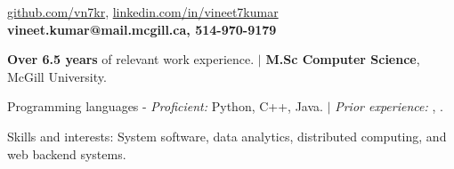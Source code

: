 \documentclass{resume} %
\begin{document}
\begin{hSubsection}
{
    \href{https://github.com/vn7kr}{github.com/vn7kr},
    \href{https://linkedin.com/in/vineet7kumar}{linkedin.com/in/vineet7kumar}
}
{
    \textbf{vineet.kumar@mail.mcgill.ca, 514-970-9179}
}
{%
}
\end{hSubsection}



\smallskip \smallskip 
\begin{rSection}{} \smallskip 
\begin{lSubsection} 
\item \textbf{Over 6.5 years} of relevant work experience.
        $\vert$ \textbf{M.Sc Computer Science}, McGill University. 
\item Programming languages - \emph{Proficient:} Python, C++, Java.
        $\vert$ \emph{Prior experience:} \xtenx, \matlabx.
\item Skills and interests: System software, data analytics, distributed
        computing, and web backend systems.
\end{lSubsection}
\end{rSection}
\end{document}
